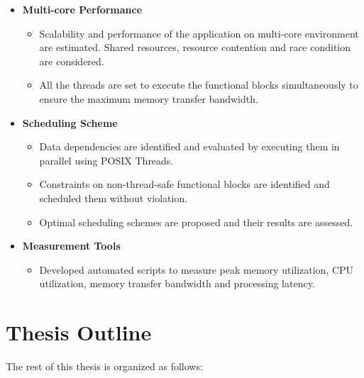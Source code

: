 \begin{itemize}
\item{\bf Multi-core Performance}
  \begin{itemize}
    \item Scalability and performance of the application on multi-core environment are estimated. Shared resources, resource contention and race condition are considered.
    \item All the threads are set to execute the functional blocks simultaneously to ensure the maximum memory transfer bandwidth.
  \end{itemize}
\item {\bf Scheduling Scheme}
 	\begin{itemize}
 	\item Data dependencies are identified and evaluated by executing them in parallel using POSIX Threads.
   	\item Constraints on non-thread-safe functional blocks are identified and scheduled them without violation.
   	\item Optimal scheduling schemes are proposed and their results are assessed.
	\end{itemize}
\item {\bf Measurement Tools}
  \begin{itemize}
      \item Developed automated scripts to measure peak memory utilization, CPU utilization, memory transfer bandwidth and processing latency.
  \end{itemize}
\end{itemize}

\section{Thesis Outline}
\label{sec:intro:outline}

The rest of this thesis is organized as follows:

